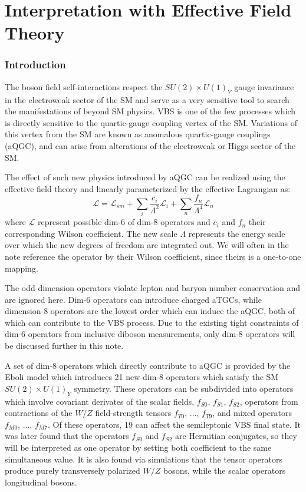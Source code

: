 \chapter{Interpretation with Effective Field Theory}
\subsection{Introduction}

The boson field self-interactions respect the $SU(2)\times U(1)_Y$ gauge invariance in the electroweak sector of the
SM and serve as a very sensitive tool to search the manifestations of beyond SM physics.
VBS is one of the few processes which is directly sensitive to the quartic-gauge coupling vertex of the SM.
Variations of this vertex from the SM are known as anomalous quartic-gauge couplings (aQGC), and can arise from alterations of the electroweak or Higgs sector of the SM.

The effect of such new physics introduced by aQGC can be realized using the effective field theory \cite{degrande2013effective} and linearly parameterized by the effective Lagrangian as:
\begin{equation*}
  \mathcal{L}=\mathcal{L}_{sm}+\sum_{i}\frac{c_i}{\Lambda^{2}}\mathcal{L}_i+\sum_{n}\frac{f_n}{\Lambda^{4}}\mathcal{L}_n
\end{equation*}
where $\mathcal{L}$ represent possible dim-6 of dim-8 operators and $c_i$ and $f_n$ their corresponding Wilson coefficient. The new scale $\Lambda$ represents the energy scale over which the new degrees of freedom are integrated out. We will often in the note reference the operator by their Wilson coefficient, since theirs is a one-to-one mapping.

The odd dimension operators violate lepton and baryon number conservation and are ignored here.
Dim-6 operators can introduce charged aTGCs, while dimension-8 operators are the lowest order which can induce the aQGC, both of which can contribute to the VBS process. 
Due to the existing tight constraints of dim-6 operators from inclusive diboson measurements, only dim-8 operators will be discussed further in this note.

A set of dim-8 operators which directly contribute to aQGC is provided by the Eboli model \cite{eboli2006p} which introduces 21 new dim-8 operators which satisfy the SM $SU(2)\times U(1)_Y$ symmetry. 
These operators can be subdivided into operators which involve covariant derivates of the scalar fields, $f_{S0}$, $f_{S1}$, $f_{S2}$, operators from contractions of the $W/Z$ field-strength tensors $f_{T0}$, ..., $f_{T9}$, and mixed operators $f_{M0}$, ..., $f_{M7}$. 
Of these operators, 19 can affect the semileptonic VBS final state.
It was later found that the operators $f_{S0}$ and $f_{S2}$ are Hermitian conjugates, so they will be interpreted as one operator by setting both coefficient to the same simultaneous value.
It is also found via simulations that the tensor operators produce purely transversely polarized $W/Z$ bosons, while the scalar operators longitudinal bosons.

